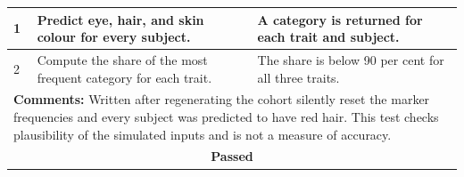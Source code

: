 \begin{table}[H]
\begin{tabular}{|llll|}
\multicolumn{1}{|l|}{1} & \multicolumn{1}{P{5.6cm}|}{Predict eye, hair, and skin colour for every subject.} & \multicolumn{2}{P{6.3cm}|}{A category is returned for each trait and subject.} \\ \hline
\multicolumn{1}{|l|}{2} & \multicolumn{1}{P{5.6cm}|}{Compute the share of the most frequent category for each trait.} & \multicolumn{2}{P{6.3cm}|}{The share is below 90 per cent for all three traits.} \\ \hline
\multicolumn{4}{|P{15.2cm}|}{\textbf{Comments:} Written after regenerating the cohort silently reset the marker frequencies and every subject was predicted to have red hair. This test checks plausibility of the simulated inputs and is not a measure of accuracy.} \\ \hline
\multicolumn{4}{|c|}{\textbf{Passed}} \\ \hline
\end{tabular}
\end{table}

